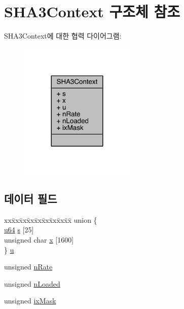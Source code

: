 \hypertarget{struct_s_h_a3_context}{}\section{S\+H\+A3\+Context 구조체 참조}
\label{struct_s_h_a3_context}


S\+H\+A3\+Context에 대한 협력 다이어그램\+:
\nopagebreak
\begin{figure}[H]
\begin{center}
\leavevmode
\includegraphics[width=156pt]{d6/d05/struct_s_h_a3_context__coll__graph}
\end{center}
\end{figure}
\subsection*{데이터 필드}
\begin{DoxyCompactItemize}
\item 
\begin{tabbing}
xx\=xx\=xx\=xx\=xx\=xx\=xx\=xx\=xx\=\kill
union \{\\
\>\hyperlink{shell_8c_a510e88e5fe50c5bcf5b3ff1ad131e109}{u64} \hyperlink{struct_s_h_a3_context_ac353f0d611651d2f23a0da1223950f8a}{s} \mbox{[}25\mbox{]}\\
\>unsigned char \hyperlink{struct_s_h_a3_context_afed763dce136f918c20ad99a8ec28adc}{x} \mbox{[}1600\mbox{]}\\
\} \hyperlink{struct_s_h_a3_context_a9b772ee291e315531a1e88688ff82b69}{u}\\

\end{tabbing}\item 
unsigned \hyperlink{struct_s_h_a3_context_a22fc5e072ef8924400267fee73dfb23f}{n\+Rate}
\item 
unsigned \hyperlink{struct_s_h_a3_context_aa4e83212aa13ac9f1eb3e42f831da090}{n\+Loaded}
\item 
unsigned \hyperlink{struct_s_h_a3_context_a970ac15a9c7454ff82f81f9764e3ff4d}{ix\+Mask}
\end{DoxyCompactItemize}



